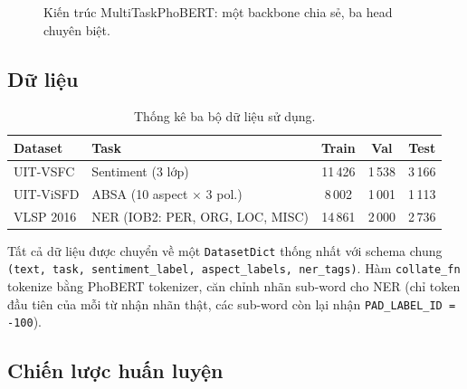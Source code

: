 \begin{figure}[H]
\caption{Kiến trúc MultiTaskPhoBERT: một backbone chia sẻ, ba head chuyên biệt.}
\label{fig:architecture}
\end{figure}

\subsection{Dữ liệu}

\begin{table}[H]
\centering
\caption{Thống kê ba bộ dữ liệu sử dụng.}
\label{tab:datasets}
\begin{tabular}{llccc}
\toprule
\textbf{Dataset} & \textbf{Task} & \textbf{Train} & \textbf{Val} & \textbf{Test} \\
\midrule
UIT-VSFC  & Sentiment (3 lớp)      & 11\,426 & 1\,538 & 3\,166 \\
UIT-ViSFD & ABSA (10 aspect $\times$ 3 pol.) & 8\,002 & 1\,001 & 1\,113 \\
VLSP 2016 & NER (IOB2: PER, ORG, LOC, MISC) & 14\,861 & 2\,000 & 2\,736 \\
\bottomrule
\end{tabular}
\end{table}

Tất cả dữ liệu được chuyển về một \texttt{DatasetDict} thống nhất
với schema chung \texttt{(text, task, sentiment\_label, aspect\_labels, ner\_tags)}.
Hàm \texttt{collate\_fn} tokenize bằng PhoBERT tokenizer, căn chỉnh nhãn sub-word
cho NER (chỉ token đầu tiên của mỗi từ nhận nhãn thật, các sub-word còn lại nhận \texttt{PAD\_LABEL\_ID = -100}).

\subsection{Chiến lược huấn luyện}

